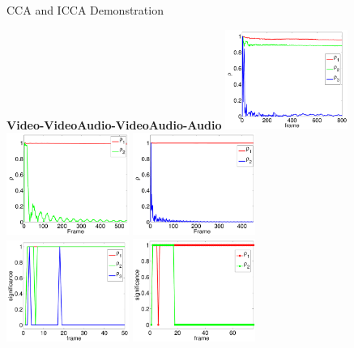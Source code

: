 \documentclass[8pt]{beamer}
\begin{document}
\begin{frame}{CCA and ICCA Demonstration}
    \begin{center}
      \hspace{2ex}\textbf{Video-Video}\hspace{14ex}\textbf{Audio-Video}\hspace{14ex}\textbf{Audio-Audio}
        \includegraphics[width=0.3\textwidth]{figures/flashing_icca_corrs.pdf}
        \hspace{2ex}
        \includegraphics[width=0.3\textwidth]{figures/av_icca_corrs.pdf}
        \hspace{2ex}
        \includegraphics[width=0.3\textwidth]{figures/aa_icca_corrs.pdf}\\
        \includegraphics[width=0.3\textwidth]{figures/flashing_icca_sig_zoom.pdf}
        \hspace{2ex}
        \includegraphics[width=0.3\textwidth]{figures/av_icca_sig_zoom.pdf}

\end{center}
\end{frame}
\end{document}
